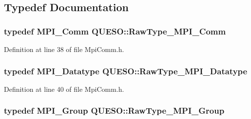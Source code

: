 \subsection{Typedef Documentation}
\hypertarget{namespace_q_u_e_s_o_af48741a7e6d7897e9e96e0f5bb26cfd7}{
\subsubsection[{Raw\-Type\-\_\-\-M\-P\-I\-\_\-\-Comm}]{\setlength{\rightskip}{0pt plus 5cm}typedef M\-P\-I\-\_\-\-Comm {\bf Q\-U\-E\-S\-O\-::\-Raw\-Type\-\_\-\-M\-P\-I\-\_\-\-Comm}}}\label{namespace_q_u_e_s_o_af48741a7e6d7897e9e96e0f5bb26cfd7}


Definition at line 38 of file Mpi\-Comm.\-h.

\hypertarget{namespace_q_u_e_s_o_a8648edf143b92c6f21f6cb93223b2cc9}{
\subsubsection[{Raw\-Type\-\_\-\-M\-P\-I\-\_\-\-Datatype}]{\setlength{\rightskip}{0pt plus 5cm}typedef M\-P\-I\-\_\-\-Datatype {\bf Q\-U\-E\-S\-O\-::\-Raw\-Type\-\_\-\-M\-P\-I\-\_\-\-Datatype}}}\label{namespace_q_u_e_s_o_a8648edf143b92c6f21f6cb93223b2cc9}


Definition at line 40 of file Mpi\-Comm.\-h.

\hypertarget{namespace_q_u_e_s_o_acbf5b0ed9be4b77acd471b3914e128c6}{
\subsubsection[{Raw\-Type\-\_\-\-M\-P\-I\-\_\-\-Group}]{\setlength{\rightskip}{0pt plus 5cm}typedef M\-P\-I\-\_\-\-Group {\bf Q\-U\-E\-S\-O\-::\-Raw\-Type\-\_\-\-M\-P\-I\-\_\-\-Group}}}\label{namespace_q_u_e_s_o_acbf5b0ed9be4b77acd471b3914e128c6}


